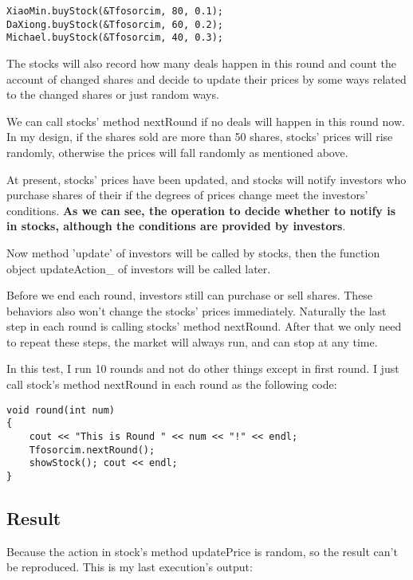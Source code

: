 \documentclass{article}
\begin{document}
\begin{lstlisting}
XiaoMin.buyStock(&Tfosorcim, 80, 0.1);
DaXiong.buyStock(&Tfosorcim, 60, 0.2);
Michael.buyStock(&Tfosorcim, 40, 0.3);
\end{lstlisting}
    
    The stocks will also record how many deals happen in this round and count the account of changed shares and decide to update their prices by some ways related to the changed shares or just random ways.
    
    We can call stocks' method nextRound if no deals will happen in this round now. In my design, if the shares sold are more than 50 shares, stocks' prices will rise randomly, otherwise the prices will fall randomly as mentioned above.
    
    At present, stocks' prices have been updated, and stocks will notify investors who purchase shares of their if the degrees of prices change meet the investors' conditions. \textbf{As we can see, the operation to decide whether to notify is in stocks, although the conditions are provided by investors}.
    
    Now method 'update' of investors will be called by stocks, then the function object updateAction\_ of investors will be called later.
    
    Before we end each round, investors still can purchase or sell shares. These behaviors also won't change the stocks' prices immediately. Naturally the last step in each round is calling stocks' method nextRound. After that we only need to repeat these steps, the market will always run, and can stop at any time.
    
    In this test, I run 10 rounds and not do other things except in first round. I just call stock's method nextRound in each round as the following code:
    
\begin{lstlisting}
void round(int num)
{
    cout << "This is Round " << num << "!" << endl;
    Tfosorcim.nextRound();
    showStock(); cout << endl;
}
\end{lstlisting}

\subsection{Result}

    Because the action in stock's method updatePrice is random, so the result can't be reproduced. This is my last execution's output:
    
\end{document}
